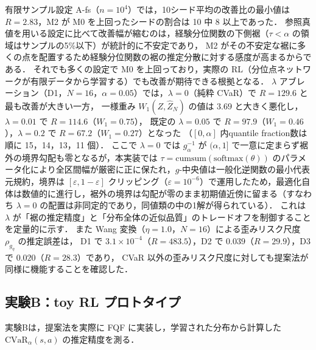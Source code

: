 \documentclass[a4paper,10pt]{jsarticle}
\theoremstyle{definition}
\newcommand{\CVaR}{\mathrm{CVaR}}
\newcommand{\Wone}{W_1}
\begin{document}
有限サンプル設定 A-fs（$n=10^4$）では，10シード平均の改善比の最小値は $R=2.83$，M2 が M0 を上回ったシードの割合は 10 中 8 以上であった．
参照真値を用いる設定に比べて改善幅が縮むのは，経験分位関数の下側裾（$\tau<\alpha$ の領域はサンプルの5\%以下）が統計的に不安定であり，
M2 がその不安定な裾に多くの点を配置するため経験分位関数の裾の推定分散に対する感度が高まるからである．
それでも多くの設定で M0 を上回っており，実際の RL（分位点ネットワークが有限データから学習する）でも改善が期待できる根拠となる．
$\lambda$ アブレーション（D1，$N=16$，$\alpha=0.05$）では，$\lambda=0$（純粋 CVaR）で $R=129.6$ と最も改善が大きい一方，
一様重み $\Wone(Z,\hat Z_N)$ の値は $3.69$ と大きく悪化し，$\lambda=0.01$ で $R=114.6$（$\Wone=0.75$），
既定の $\lambda=0.05$ で $R=97.9$（$\Wone=0.46$），$\lambda=0.2$ で $R=67.2$（$\Wone=0.27$）となった
（$[0,\alpha]$ 内quantile fraction数は順に 15，14，13，11 個）．
ここで $\lambda=0$ では $g_\alpha^{-1}$ が $(\alpha,1]$ で一意に定まらず裾外の境界勾配も零となるが，本実装では $\tau=\mathrm{cumsum}(\mathrm{softmax}(\theta))$ のパラメータ化により全区間幅が厳密に正に保たれ，$g$-中央値は一般化逆関数の最小代表元規約，境界は $[\varepsilon,1-\varepsilon]$ クリッピング（$\varepsilon=10^{-6}$）で運用したため，最適化自体は数値的に進行し，裾外の境界は勾配が零のまま初期値近傍に留まる（すなわち $\lambda=0$ の配置は非同定的であり，同値類の中の1解が得られている）．
これは $\lambda$ が「裾の推定精度」と「分布全体の近似品質」のトレードオフを制御することを定量的に示す．
また Wang 変換（$\eta=1.0$，$N=16$）による歪みリスク尺度 $\rho_{g_\eta}$ の推定誤差は，
D1 で $3.1\times10^{-4}$（$R=483.5$），D2 で $0.039$（$R=29.9$），D3 で $0.020$（$R=28.3$）であり，
CVaR 以外の歪みリスク尺度に対しても提案法が同様に機能することを確認した．

\subsection{実験B：toy RL プロトタイプ}
\label{subsec:expB}
実験Bは，提案法を実際に FQF に実装し，学習された分布から計算した $\CVaR_\alpha(s,a)$ の推定精度を測る．
\end{document}
